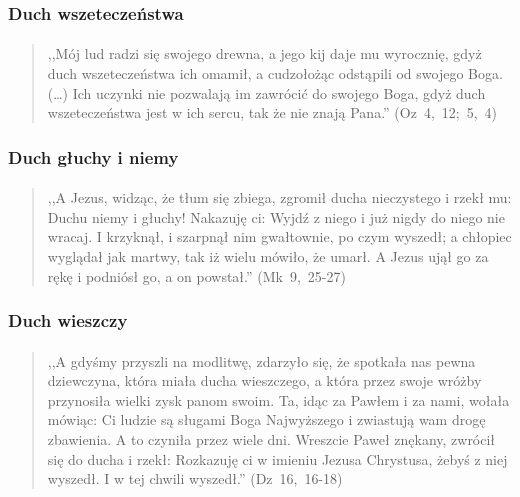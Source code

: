 \documentclass[10pt,a4paper,oneside]{article}
\begin{document}
\subsubsection{Duch wszeteczeństwa}
\paragraph{}
\begin{quote}
,,Mój lud radzi się swojego drewna, a jego kij daje mu wyrocznię, gdyż duch wszeteczeństwa ich omamił, a cudzołożąc odstąpili od swojego Boga. (\ldots) Ich uczynki nie pozwalają im zawrócić do swojego Boga, gdyż duch wszeteczeństwa jest w ich sercu, tak że nie znają Pana.'' \mbox{(Oz 4, 12; 5, 4)}
\end{quote}
\subsubsection{Duch głuchy i niemy}
\paragraph{}
\begin{quote}
,,A Jezus, widząc, że tłum się zbiega, zgromił ducha nieczystego i rzekł mu: Duchu niemy i głuchy! Nakazuję ci: Wyjdź z niego i już nigdy do niego nie wracaj. I krzyknął, i szarpnął nim gwałtownie, po czym wyszedł; a chłopiec wyglądał jak martwy, tak iż wielu mówiło, że umarł. A Jezus ujął go za rękę i podniósł go, a on powstał.'' \mbox{(Mk 9, 25-27)}
\end{quote}
\subsubsection{Duch wieszczy}
\paragraph{}
\begin{quote}
,,A gdyśmy przyszli na modlitwę, zdarzyło się, że spotkała nas pewna dziewczyna, która miała ducha wieszczego, a która przez swoje wróżby przynosiła wielki zysk panom swoim. Ta, idąc za Pawłem i za nami, wołała mówiąc: Ci ludzie są sługami Boga Najwyższego i zwiastują wam drogę zbawienia. A to czyniła przez wiele dni. Wreszcie Paweł znękany, zwrócił się do ducha i rzekł: Rozkazuję ci w imieniu Jezusa Chrystusa, żebyś z niej wyszedł. I w tej chwili wyszedł.'' \mbox{(Dz 16, 16-18)}
\end{quote}
\end{document}
